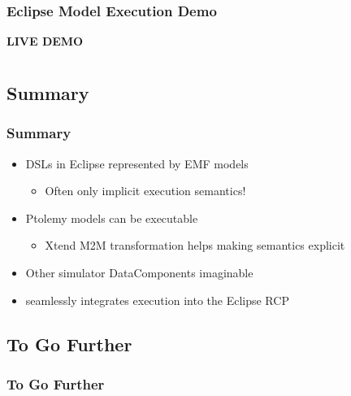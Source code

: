 \begin{frame}
  \frametitle{Eclipse Model Execution Demo}
  \begin{center} 
      \textbf{\Large {LIVE DEMO}}
  \end{center}
  \end{frame}

\section*{}

\subsection<presentation>[Summary]{Summary}
\begin{frame}
  \frametitle{Summary}
        \begin{itemize}
	           \item DSLs in Eclipse represented by EMF models
								\begin{itemize}
									 \pause
				           \item Often only implicit execution semantics!
								\end{itemize}
						 \pause
	           \item Ptolemy models can be executable
								\begin{itemize}
				           \pause
	    			       \item Xtend M2M transformation helps making semantics explicit
								\end{itemize}
						 \pause
						 \item Other simulator DataComponents imaginable
						 \pause
						 \item {} seamlessly integrates execution into the Eclipse RCP
        \end{itemize}
\end{frame}

\subsection<presentation>[To Go Further]{To Go Further}
\begin{frame}
  \frametitle<presentation>[To Go Further]{To Go Further}
  \normalsize
  
\end{frame}


